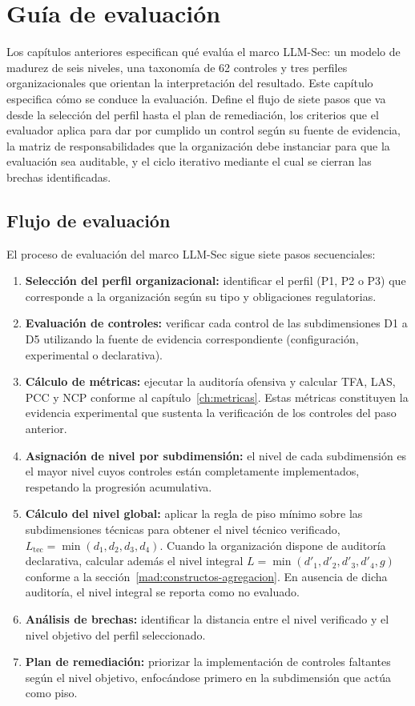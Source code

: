 \chapter{Guía de evaluación}
\label{ch:guia}

Los capítulos anteriores especifican qué evalúa el marco LLM-Sec: un modelo de madurez de seis niveles, una taxonomía de 62 controles y tres perfiles organizacionales que orientan la interpretación del resultado. Este capítulo especifica cómo se conduce la evaluación. Define el flujo de siete pasos que va desde la selección del perfil hasta el plan de remediación, los criterios que el evaluador aplica para dar por cumplido un control según su fuente de evidencia, la matriz de responsabilidades que la organización debe instanciar para que la evaluación sea auditable, y el ciclo iterativo mediante el cual se cierran las brechas identificadas.

\section{Flujo de evaluación}
\label{sec:flujo-evaluacion}

El proceso de evaluación del marco LLM-Sec sigue siete pasos secuenciales:

\begin{enumerate}[leftmargin=2em]
  \item \textbf{Selección del perfil organizacional:} identificar el perfil (P1, P2 o P3) que corresponde a la organización según su tipo y obligaciones regulatorias.
  \item \textbf{Evaluación de controles:} verificar cada control de las subdimensiones D1 a D5 utilizando la fuente de evidencia correspondiente (configuración, experimental o declarativa).
  \item \textbf{Cálculo de métricas:} ejecutar la auditoría ofensiva y calcular TFA, LAS, PCC y NCP conforme al capítulo~\ref{ch:metricas}. Estas métricas constituyen la evidencia experimental que sustenta la verificación de los controles del paso anterior.
  \item \textbf{Asignación de nivel por subdimensión:} el nivel de cada subdimensión es el mayor nivel cuyos controles están completamente implementados, respetando la progresión acumulativa.
  \item \textbf{Cálculo del nivel global:} aplicar la regla de piso mínimo
  sobre las subdimensiones técnicas para obtener el nivel técnico
  verificado, $L_{\text{tec}} = \min(d_1, d_2, d_3, d_4)$. Cuando la
  organización dispone de auditoría declarativa, calcular además el nivel
  integral $L = \min(d'_1, d'_2, d'_3, d'_4, g)$ conforme a la
  sección~\ref{mad:constructos-agregacion}. En ausencia de dicha auditoría,
  el nivel integral se reporta como no evaluado.
  \item \textbf{Análisis de brechas:} identificar la distancia entre el nivel verificado y el nivel objetivo del perfil seleccionado.
  \item \textbf{Plan de remediación:} priorizar la implementación de controles faltantes según el nivel objetivo, enfocándose primero en la subdimensión que actúa como piso.
\end{enumerate}

